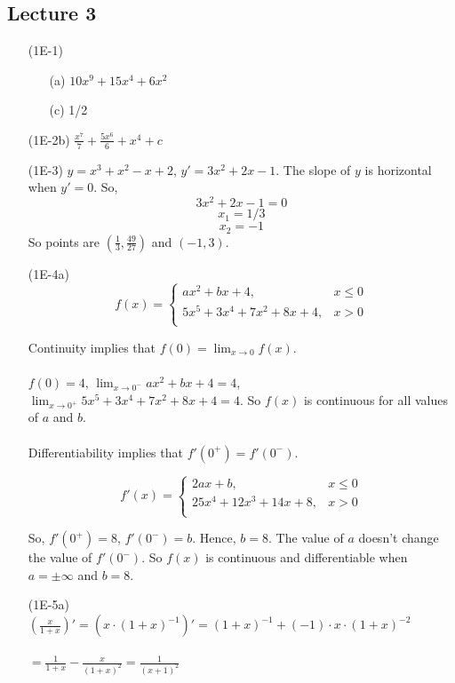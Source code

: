\documentclass{article}
\begin{document}
\subsection{Lecture 3}
\begin{itemize}
\item[(1E-1)]
\begin{itemize}
    \item[(a)] $10x^9+15x^4+6x^2$
    \item[(c)] 1/2
\end{itemize}
\item[(1E-2b)] $\frac{x^7}{7}+\frac{5x^6}{6}+x^4 + c$
\item[(1E-3)] $y = x^3 + x^2 - x + 2$, $y' = 3x^2 + 2x - 1$. The slope of $y$ is horizontal when $y' = 0$. So,
\[ 3x^2 + 2x - 1 = 0  \]
\[ x_1 = 1/3 \] 
\[ x_2 = -1 \]
So points are $\left( \frac{1}{3}, \frac{49}{27} \right)$ and $(-1, 3)$.
\item[(1E-4a)]
\[f(x)=
    \left\{
      \begin{array}{ll}
      ax^2+bx+4, & x \leq 0 \\
      5x^5+3x^4+7x^2+8x+4, & x > 0 \\
      \end{array} 
      \right.
    \]

Continuity implies that $f(0) = \lim_{x \to 0} f(x)$. \\ \\
$f(0) = 4$, $\lim_{x \to 0^-} ax^2 + bx + 4 = 4$, $\lim_{x \to 0^+} 5x^5+3x^4+7x^2+8x+4 = 4$. So $f(x)$ is continuous for all values of $a$ and $b$. \\ \\
Differentiability implies that $f'(0^+) = f'(0^-)$.

\[f'(x)=
    \left\{
      \begin{array}{ll}
      2ax+b, & x \leq 0 \\
      25x^4+12x^3+14x+8, & x > 0 \\
      \end{array} 
      \right.
    \]

So, $f'(0^+) = 8$, $f'(0^-) = b$. Hence, $b = 8$. The value of $a$ doesn't change the value of $f'(0^-)$. So $f(x)$ is continuous and differentiable when $a = \pm \infty$ and $b = 8$. 

\item[(1E-5a)] $\left( \frac{x}{1+x} \right)' = \left( x \cdot (1+x)^{-1} \right)' = (1+x)^{-1} + (-1) \cdot x \cdot (1+x)^{-2}$ \\ \\ 
$ = \frac{1}{1+x} - \frac{x}{(1+x)^2} = \frac{1}{(x+1)^2}$  


\end{itemize}
\end{document}
